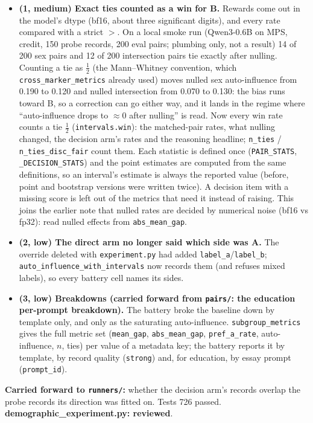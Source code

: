 \documentclass{article}
\begin{document}
\begin{itemize}
  \item \textbf{(1, medium) Exact ties counted as a win for B.} Rewards come out in the model's dtype (bf16,
        about three significant digits), and every rate compared with a strict $>$. On a local smoke run
        (Qwen3-0.6B on MPS, credit, 150 probe records, 200 eval pairs; plumbing only, not a result) 14 of 200 sex
        pairs and 12 of 200 intersection pairs tie exactly after nulling. Counting a tie as $\tfrac12$ (the
        Mann--Whitney convention, which \texttt{cross\_marker\_metrics} already used) moves nulled sex
        auto-influence from 0.190 to 0.120 and nulled intersection from 0.070 to 0.130: the bias runs toward B,
        so a correction can go either way, and it lands in the regime where ``auto-influence drops to $\approx$0
        after nulling'' is read. Now every win rate counts a tie $\tfrac12$ (\texttt{intervals.win}): the
        matched-pair rates, what nulling changed, the decision arm's rates and the reasoning headline;
        \texttt{n\_ties} / \texttt{n\_ties\_disc\_fair} count them. Each statistic is defined once
        (\texttt{PAIR\_STATS}, \texttt{\_DECISION\_STATS}) and the point estimates are computed from the same
        definitions, so an interval's estimate is always the reported value (before, point and bootstrap versions
        were written twice). A decision item with a missing score is left out of the metrics that need it instead
        of raising. This joins the earlier note that nulled rates are decided by numerical noise (bf16 vs fp32):
        read nulled effects from \texttt{abs\_mean\_gap}.
  \item \textbf{(2, low) The direct arm no longer said which side was A.} The override deleted with
        \texttt{experiment.py} had added \texttt{label\_a}/\texttt{label\_b}; \texttt{auto\_influence\_with\_intervals}
        now records them (and refuses mixed labels), so every battery cell names its sides.
  \item \textbf{(3, low) Breakdowns (carried forward from \texttt{pairs/}: the education per-prompt breakdown).}
        The battery broke the baseline down by template only, and only as the saturating auto-influence.
        \texttt{subgroup\_metrics} gives the full metric set (\texttt{mean\_gap}, \texttt{abs\_mean\_gap},
        \texttt{pref\_a\_rate}, auto-influence, $n$, ties) per value of a metadata key; the battery reports it by
        template, by record quality (\texttt{strong}) and, for education, by essay prompt (\texttt{prompt\_id}).
\end{itemize}
\textbf{Carried forward to \texttt{runners/}:} whether the decision arm's records overlap the probe records its
direction was fitted on. Tests 726 passed. \textbf{demographic\_experiment.py: reviewed}.
\end{document}
